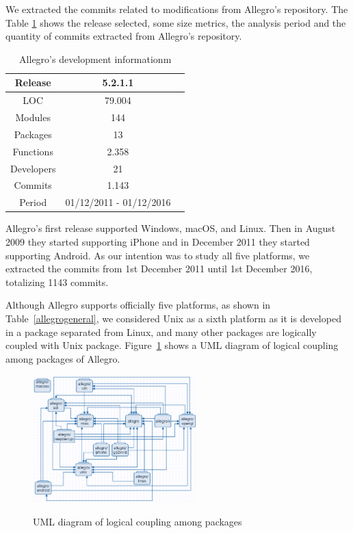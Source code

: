 \documentclass[10pt, conference]{IEEEtran}
\begin{document}
We extracted the commits related to modifications from Allegro's repository. The Table \ref{allegroinfo} shows the release selected, some size metrics, the analysis period  and the quantity of commits extracted from Allegro's repository.  



\begin{table}[h]
\renewcommand{\arraystretch}{1.3}
\caption{Allegro’s development informationm}
\label{allegroinfo}
\centering
\begin{tabular}{|c|c|c|}
\hline
Release & 5.2.1.1\\
\hline
LOC & 79.004 \\
\hline
Modules & 144\\
\hline
Packages & 13\\
\hline
Functions & 2.358\\
\hline
Developers & 21 \\
\hline
Commits & 1.143  \\
\hline
Period & 01/12/2011 - 01/12/2016   \\
\hline
\end{tabular}
\end{table}

Allegro's first release supported Windows, macOS, and Linux. Then in August 2009 they started supporting iPhone and in December 2011 they started supporting Android. As our intention was to study all five platforms, we extracted the commits from 1st December 2011 until 1st December 2016, totalizing 1143 commits.  

Although Allegro supports officially five platforms, as shown in Table~\ref{allegrogeneral}, we considered Unix as a sixth platform as it is developed in a package separated from Linux, and many other packages are logically coupled with Unix package. Figure~\ref{diagrama} shows a UML diagram of logical coupling among packages of Allegro. 

\begin{figure}[h]
\centering
\textbf{}\includegraphics[width=2.5in]{diagrama}
\caption{UML diagram of logical coupling among packages}
\label{diagrama}
\end{figure} 
\end{document}
